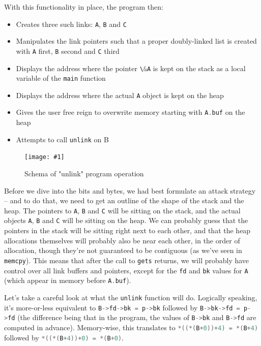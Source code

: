 \documentclass{article}
\newcommand{\displayimagecaphere}[2] {
    \begin{figure}[H]
    \centering
    \texttt{[image: \#1]} 
    \caption{#2}
\end{figure}
}
\newcommand{\xcode}[2]{\colorbox{ubuntuback}{\lstinline[language=#1]|#2|}}
\begin{document}
With this functionality in place, the program then:

\begin{itemize}
    \item Creates three such links: \xcode{C}{A}, \xcode{C}{B} and \xcode{C}{C} 
    \item Manipulates the link pointers such that a proper doubly-linked list is created with \xcode{C}{A} first, \xcode{C}{B} second and \xcode{C}{C} third
    \item Displays the address where the pointer \xcode{C}{\&A} is kept on the stack as a local variable of the \xcode{C}{main} function
    \item Displays the address where the actual \xcode{C}{A} object is kept on the heap
    \item Gives the user free reign to overwrite memory starting with \xcode{C}{A.buf} on the heap
    \item Attempts to call \xcode{C}{unlink} on B
\end{itemize}

\displayimagecaphere{./exercises/18_unlink/semantic_diagram.png}{Schema of "unlink" program operation}

Before we dive into the bits and bytes, we had best formulate an attack strategy -- and to do that, we need to get an outline of the shape of the stack and the heap. The pointers to \xcode{C}{A}, \xcode{C}{B} and \xcode{C}{C} will be sitting on the stack, and the actual objects \xcode{C}{A}, \xcode{C}{B} and \xcode{C}{C} will be sitting on the heap. We can probably guess that the pointers in the stack will be sitting right next to each other, and that the heap allocations themselves will probably also be near each other, in the order of allocation, though they're not guaranteed to be contiguous (as we've seen in \xcode{C}{memcpy}). This means that after the call to \xcode{C}{gets} returns, we will probably have control over all link buffers and pointers, except for the \xcode{C}{fd} and \xcode{C}{bk} values for \xcode{C}{A} (which appear in memory before \xcode{C}{A.buf}).

Let's take a careful look at what the \xcode{C}{unlink} function will do. Logically speaking, it's more-or-less equivalent to \xcode{C}{B->fd->bk = p->bk} followed by \xcode{C}{B->bk->fd = p->fd} (the difference being that in the program, the values of \xcode{C}{B->bk} and \xcode{C}{B->fd} are computed in advance). Memory-wise, this translates to \xcode{C}{*((*(B+0))+4) = *(B+4)} followed by \xcode{C}{*((*(B+4))+0) = *(B+0)}. 
\end{document}
